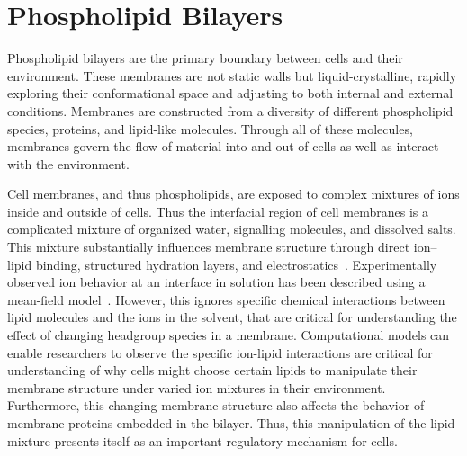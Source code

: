 \section{Phospholipid Bilayers}
Phospholipid bilayers are the primary boundary between cells and their environment. These membranes are not static walls but liquid-crystalline, rapidly exploring their 
conformational space and adjusting to both internal and external conditions. Membranes are constructed from a diversity of different phospholipid species, 
proteins, and lipid-like molecules. Through all of these molecules, membranes 
govern the flow of material into and out of cells as well as interact with the environment.

Cell membranes, and thus phospholipids, are exposed to complex
mixtures of ions inside and outside of cells.
Thus the interfacial region of cell membranes is a complicated mixture of organized water, signalling molecules, and dissolved salts. 
This mixture substantially influences membrane structure through direct ion–lipid binding, structured hydration layers, and electrostatics~\cite{pandit:2003:dppc:na,Berkowitz:2006}.
Experimentally observed ion behavior at an interface in solution has been described using a mean-field model~\cite{israelachvili:2011:intermol}.
However, this ignores specific chemical interactions between lipid molecules and the ions in the solvent, that are critical for understanding
the effect of changing headgroup species in a membrane. 
Computational models can enable researchers to observe the specific ion-lipid interactions are critical for understanding of 
why cells might choose certain lipids to manipulate their membrane structure under varied ion mixtures in their environment. Furthermore, this 
changing membrane structure also affects the behavior of membrane proteins embedded in the bilayer. Thus, this manipulation of the lipid mixture
presents itself as an important regulatory mechanism for cells.
